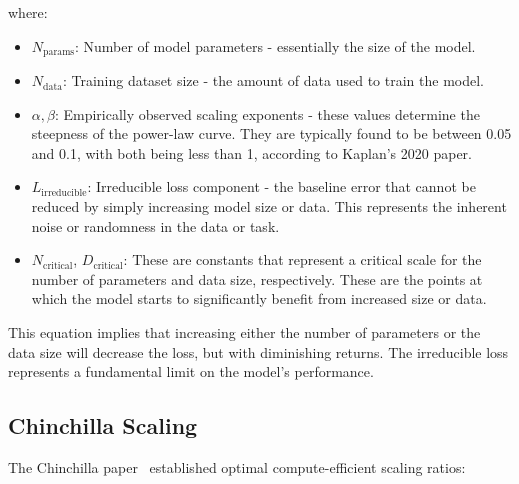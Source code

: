 where:
\begin{itemize}[noitemsep]
    \item \(N_\text{params}\): Number of model parameters - essentially the size of the model.
    \item \(N_\text{data}\): Training dataset size - the amount of data used to train the model.
    \item \(\alpha, \beta\): Empirically observed scaling exponents - these values determine the steepness of the power-law curve. They are typically found to be between 0.05 and 0.1, with both being less than 1, according to Kaplan's 2020 paper.
    \item \(L_\text{irreducible}\): Irreducible loss component - the baseline error that cannot be reduced by simply increasing model size or data. This represents the inherent noise or randomness in the data or task.
    \item \(N_\text{critical}\), \(D_\text{critical}\): These are constants that represent a critical scale for the number of parameters and data size, respectively. These are the points at which the model starts to significantly benefit from increased size or data.
\end{itemize}

This equation implies that increasing either the number of parameters or the data size will decrease the loss, but with diminishing returns. The irreducible loss represents a fundamental limit on the model's performance.

\subsection{Chinchilla Scaling}
\noindent
The Chinchilla paper~\cite{hoffmann2022training} established optimal compute-efficient scaling ratios:

